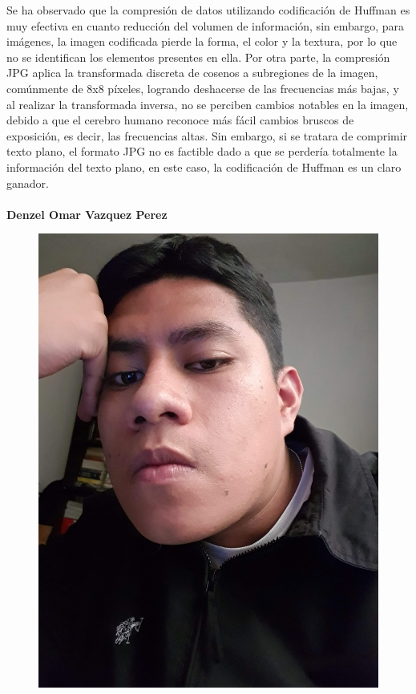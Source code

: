 \documentclass[12pt,twoside]{article}
\begin{document}
    Se ha observado que la compresión de datos utilizando codificación de Huffman es muy efectiva en cuanto reducción del volumen de información, sin embargo, para imágenes, la imagen codificada pierde la forma, el color y la textura, por lo que no se identifican los elementos presentes en ella. 
    Por otra parte, la compresión JPG aplica la transformada discreta de cosenos a subregiones de la imagen, comúnmente de 8x8 píxeles, logrando deshacerse de las frecuencias más bajas, y al realizar la transformada inversa, no se perciben cambios notables en la imagen, debido a que el cerebro humano reconoce más fácil cambios bruscos de exposición, es decir, las frecuencias altas. Sin embargo, si se tratara de comprimir texto plano, el formato JPG no es factible dado a que se perdería totalmente la información del texto plano, en este caso, la codificación de Huffman es un claro ganador.
    \\\\
    \textbf{\large Denzel Omar Vazquez Perez}
        \begin{figure}[H]
            \centering
            \includegraphics[angle=-90, scale= 0.05]{imagenes/foto2.jpg}
        \end{figure}
\end{document}
